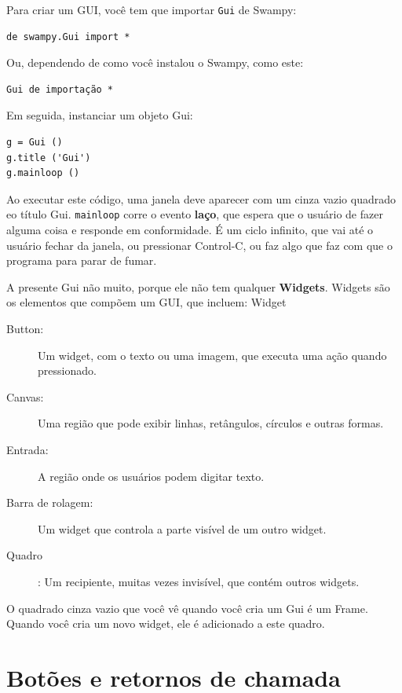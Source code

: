 \documentclass[10pt]{book}
\begin{document}
\begin{exercise}
\begin{v erbatim}
Para criar um GUI, você tem que importar {\tt Gui} de Swampy:
%
\begin{verbatim}
de swampy.Gui import *
\end{verbatim}
%
Ou, dependendo de como você instalou o Swampy, como este:
%
\begin{verbatim}
Gui de importação *
\end{verbatim}
%
Em seguida, instanciar um objeto Gui:
%
\begin{verbatim}
g = Gui ()
g.title ('Gui')
g.mainloop ()
\end{verbatim}
%
Ao executar este código, uma janela deve aparecer com um cinza vazio
quadrado eo título {\sf Gui}. {\tt mainloop} corre o evento {\bf
  laço}, que espera que o usuário de fazer alguma coisa e responde
em conformidade. É um ciclo infinito, que vai até o usuário fechar
da janela, ou pressionar Control-C, ou faz algo que faz com que o
programa para parar de fumar.

A presente Gui não muito, porque ele não tem qualquer
{\bf Widgets}. Widgets são os elementos que compõem um
GUI, que incluem:
\index{} Widget

\begin{description}

\item[Button:] Um widget, com o texto ou uma imagem, que
executa uma ação quando pressionado.

\item[Canvas:] Uma região que pode exibir linhas, retângulos,
círculos e outras formas.

\item[Entrada:] A região onde os usuários podem digitar texto.

\item[Barra de rolagem:] Um widget que controla a parte visível de um outro
widget.

\item[Quadro]: Um recipiente, muitas vezes invisível, que contém outros
widgets.

\end{description}

O quadrado cinza vazio que você vê quando você cria um Gui é
um Frame. Quando você cria um novo widget, ele é adicionado a este quadro.



\section{Botões e retornos de chamada}


\end{v erbatim}
\end{exercise}
\end{document}

